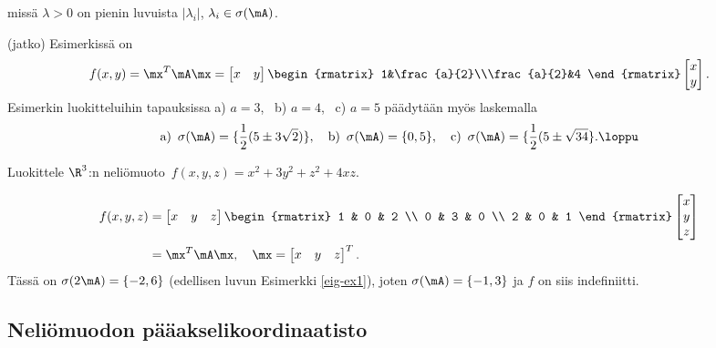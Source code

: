 missä $\lambda>0$ on pienin luvuista $|\lambda_i|$, $\lambda_i\in\sigma(\mA)$.
\jatko \begin{Exa} (jatko) Esimerkissä on
\[
f(x,y) = \mx^T\mA\mx = \begin{bmatrix} x&y \end{bmatrix}
                       \begin{rmatrix} 1&\frac{a}{2}\\\frac{a}{2}&4 \end{rmatrix}
                       \begin{bmatrix} x\\y \end{bmatrix}.
\]
Esimerkin luokitteluihin tapauksissa a) $a=3$, \ b) $a=4$, \ c) $a=5$ päädytään myös
laskemalla
\[
\text{a)}\,\ \sigma(\mA)=\{\frac{1}{2}(5 \pm 3\sqrt{2})\}, \quad
\text{b)}\,\ \sigma(\mA)=\{0,5\}, \quad
\text{c)}\,\ \sigma(\mA)=\{\frac{1}{2}(5 \pm \sqrt{34}\}. \loppu
\]
\end{Exa} 
\begin{Exa} Luokittele $\R^3$:n neliömuoto $\,f(x,y,z)=x^2+3y^2+z^2+4xz$.
\end{Exa}
\ratk
\begin{align*}
f(x,y,z) &= \begin{bmatrix} x & y & z \end{bmatrix} \begin{rmatrix}
1 & 0 & 2 \\ 0 & 3 & 0 \\ 2 & 0 & 1 \end{rmatrix}\begin{bmatrix} x \\ y \\ z \end{bmatrix} \\
&= \mx^T\mA\mx,\quad \mx=\begin{bmatrix} x & y & z \end{bmatrix}^T.
\end{align*}
Tässä on $\sigma(2\mA)=\{-2,6\}$ (edellisen luvun Esimerkki \ref{eig-ex1}), joten
$\sigma(\mA)=\{-1,3\}$ ja $f$ on siis indefiniitti. \loppu

\subsection*{Neliömuodon pääakselikoordinaatisto}

